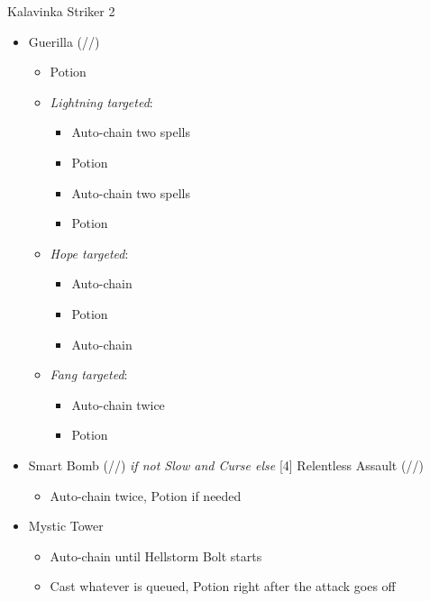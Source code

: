 \begin{multicols}{2}
	\renewcommand{\first}{[1] Guerilla (\rav/\syn/\sab)}
	\renewcommand{\second}{[2] Smart Bomb (\rav/\rav/\sab)}
	\renewcommand{\third}{[3] Mystic Tower}
	\renewcommand{\fourth}{[4] Relentless Assault (\rav/\rav/\com)}
	\renewcommand{\fifth}{[5] Aggression (\com/\rav/\com)}
	\begin{battle}[1:28]{Kalavinka Striker 2}
		\begin{itemize}
			\item \first
			      \begin{itemize}
				      \item Potion
				      \item \textit{Lightning targeted}:
				            \begin{itemize}
					            \item Auto-chain two spells
					            \item Potion
					            \item Auto-chain two spells
					            \item Potion
				            \end{itemize}
				      \item \textit{Hope targeted}:
				            \begin{itemize}
					            \item Auto-chain
					            \item Potion
					            \item Auto-chain
				            \end{itemize}
				      \item \textit{Fang targeted}:
				            \begin{itemize}
					            \item Auto-chain twice
					            \item Potion
				            \end{itemize}
			      \end{itemize}
			\item \second \textit{ if not Slow and Curse else} \fourth
			      \begin{itemize}
				      \item Auto-chain twice, Potion if needed
			      \end{itemize}
			\item \third
			      \begin{itemize}
				      \item Auto-chain until Hellstorm Bolt starts
				      \item Cast whatever is queued, Potion right after the attack goes off

\end{itemize}
\end{itemize}
\end{battle}
\end{multicols}
